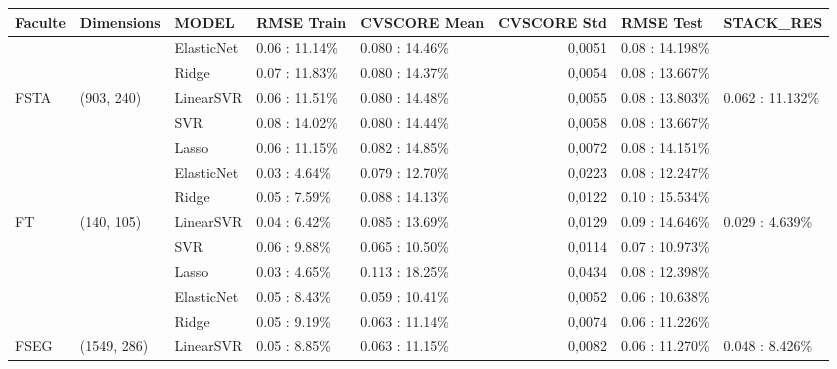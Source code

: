 \begin{tabular}{lllllrll}
\toprule
Faculte &   Dimensions &       MODEL &     RMSE Train &     CVSCORE Mean &  CVSCORE Std &       RMSE Test &        STACK\_RES \\
\midrule
        &              &  ElasticNet &  0.06 : 11.14\% &  0.080  : 14.46\% &       0,0051 &  0.08 : 14.198\% &                  \\ \cline{3-8}
        &              &       Ridge &  0.07 : 11.83\% &  0.080  : 14.37\% &       0,0054 &  0.08 : 13.667\% &                  \\ \cline{3-8}
   FSTA &   (903, 240) &   LinearSVR &  0.06 : 11.51\% &  0.080  : 14.48\% &       0,0055 &  0.08 : 13.803\% &  0.062 : 11.132\% \\ \cline{1-8}
        &              &         SVR &  0.08 : 14.02\% &  0.080  : 14.44\% &       0,0058 &  0.08 : 13.667\% &                  \\ \cline{3-8}
        &              &       Lasso &  0.06 : 11.15\% &  0.082  : 14.85\% &       0,0072 &  0.08 : 14.151\% &                  \\ \cline{3-8}
        &              &  ElasticNet &   0.03 : 4.64\% &  0.079  : 12.70\% &       0,0223 &  0.08 : 12.247\% &                  \\ \cline{3-8}
        &              &       Ridge &   0.05 : 7.59\% &  0.088  : 14.13\% &       0,0122 &  0.10 : 15.534\% &                  \\ \cline{3-8}
     FT &   (140, 105) &   LinearSVR &   0.04 : 6.42\% &  0.085  : 13.69\% &       0,0129 &  0.09 : 14.646\% &   0.029 : 4.639\% \\ \cline{1-8}
        &              &         SVR &   0.06 : 9.88\% &  0.065  : 10.50\% &       0,0114 &  0.07 : 10.973\% &                  \\ \cline{3-8}
        &              &       Lasso &   0.03 : 4.65\% &  0.113  : 18.25\% &       0,0434 &  0.08 : 12.398\% &                  \\ \cline{3-8}
        &              &  ElasticNet &   0.05 : 8.43\% &  0.059  : 10.41\% &       0,0052 &  0.06 : 10.638\% &                  \\ \cline{3-8}
        &              &       Ridge &   0.05 : 9.19\% &  0.063  : 11.14\% &       0,0074 &  0.06 : 11.226\% &                  \\ \cline{3-8}
   FSEG &  (1549, 286) &   LinearSVR &   0.05 : 8.85\% &  0.063  : 11.15\% &       0,0082 &  0.06 : 11.270\% &   0.048 : 8.426\% \\ \cline{1-8}

\end{tabular}
